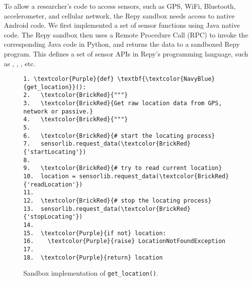 To allow a researcher's code to access sensors, such as 
GPS, WiFi, Bluetooth, accelerometer, and cellular network, the Repy  
sandbox needs access to native Android code.  We first implemented a set of sensor 
functions using Java native code.  The Repy 
sandbox then uses a Remote Procedure Call (RPC) to invoke the
corresponding Java code in Python, and returns the data 
to a sandboxed Repy program. This defines a set of sensor APIs in 
Repy's programming language, such as , 
, , etc. 

\begin{figure}
\begin{Verbatim}
1. \textcolor{Purple}{def} \textbf{\textcolor{NavyBlue}{get_location}}():
2.   \textcolor{BrickRed}{"""}
3.   \textcolor{BrickRed}{Get raw location data from GPS, network or passive.}
4.   \textcolor{BrickRed}{"""}
5. 
6.   \textcolor{BrickRed}{# start the locating process} 
7.   sensorlib.request_data(\textcolor{BrickRed}{'startLocating'})
8.
9.   \textcolor{BrickRed}{# try to read current location}
10.  location = sensorlib.request_data(\textcolor{BrickRed}{'readLocation'})
11.
12.  \textcolor{BrickRed}{# stop the locating process} 
13.  sensorlib.request_data(\textcolor{BrickRed}{'stopLocating'})
14.
15.  \textcolor{Purple}{if not} location:
16.    \textcolor{Purple}{raise} LocationNotFoundException    
17.  
18.  \textcolor{Purple}{return} location
\end{Verbatim}
\caption{\small Sandbox implementation of \texttt{get\_location()}. 
\label{fig-getlocation}}
\end{figure}


